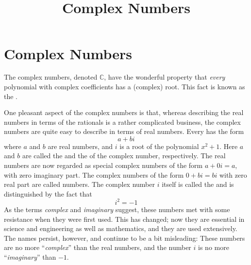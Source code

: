 \documentclass{ximera}
\title{Complex Numbers} \license{CC BY-SA-NC 4.0}
\begin{document}
\begin{abstract}
\end{abstract}
\maketitle

\section*{Complex Numbers}
The complex numbers, denoted $\mathbb{C}$, have the wonderful property that \textit{every} polynomial with complex coefficients has a (complex) root. This fact is known as the .

One pleasant aspect of the complex
numbers is that, whereas describing the real numbers in terms of the
rationals is a rather complicated business, the complex numbers are
quite easy to describe in terms of real numbers. Every  has the form
\begin{equation*}
a + bi
\end{equation*}
where $a$ and $b$ are real numbers, and $i$ is a root of the polynomial $x^{2} + 1$. Here $a$ and $b$ are called the  and the  of the complex number, respectively. The real numbers are now regarded as special complex numbers of the form $a + 0i = a$, with zero imaginary part. The complex numbers of the form $0 + bi = bi$ with zero real part are called  numbers. The complex number $i$ itself is called the  and is distinguished by the fact that
\begin{equation*}
i^2 = -1
\end{equation*}
As the terms \textit{complex} and \textit{imaginary}
 suggest, these numbers met with some resistance when they were first
used. This has changed; now they are essential in science and
engineering as well as mathematics, and they are used extensively. The
names persist, however, and continue to be a bit misleading: These
numbers are no more ``\textit{complex}'' than the real numbers, and the number $i$ is no more ``\textit{imaginary}'' than $-1$.
\end{document}
